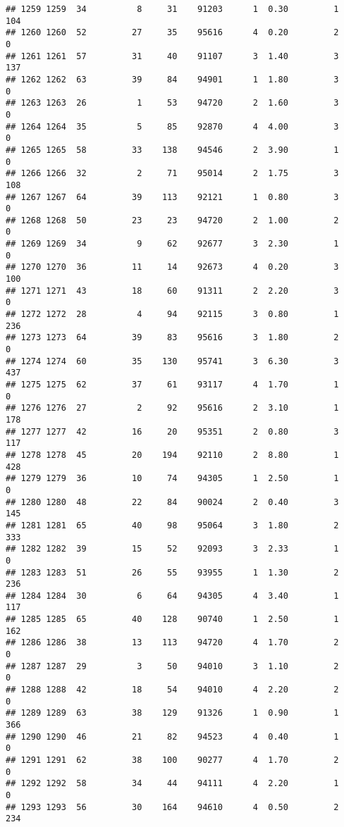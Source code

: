 \documentclass[
]{article}
\begin{document}
\begin{verbatim}
## 1259 1259  34          8     31    91203      1  0.30         1      104
## 1260 1260  52         27     35    95616      4  0.20         2        0
## 1261 1261  57         31     40    91107      3  1.40         3      137
## 1262 1262  63         39     84    94901      1  1.80         3        0
## 1263 1263  26          1     53    94720      2  1.60         3        0
## 1264 1264  35          5     85    92870      4  4.00         3        0
## 1265 1265  58         33    138    94546      2  3.90         1        0
## 1266 1266  32          2     71    95014      2  1.75         3      108
## 1267 1267  64         39    113    92121      1  0.80         3        0
## 1268 1268  50         23     23    94720      2  1.00         2        0
## 1269 1269  34          9     62    92677      3  2.30         1        0
## 1270 1270  36         11     14    92673      4  0.20         3      100
## 1271 1271  43         18     60    91311      2  2.20         3        0
## 1272 1272  28          4     94    92115      3  0.80         1      236
## 1273 1273  64         39     83    95616      3  1.80         2        0
## 1274 1274  60         35    130    95741      3  6.30         3      437
## 1275 1275  62         37     61    93117      4  1.70         1        0
## 1276 1276  27          2     92    95616      2  3.10         1      178
## 1277 1277  42         16     20    95351      2  0.80         3      117
## 1278 1278  45         20    194    92110      2  8.80         1      428
## 1279 1279  36         10     74    94305      1  2.50         1        0
## 1280 1280  48         22     84    90024      2  0.40         3      145
## 1281 1281  65         40     98    95064      3  1.80         2      333
## 1282 1282  39         15     52    92093      3  2.33         1        0
## 1283 1283  51         26     55    93955      1  1.30         2      236
## 1284 1284  30          6     64    94305      4  3.40         1      117
## 1285 1285  65         40    128    90740      1  2.50         1      162
## 1286 1286  38         13    113    94720      4  1.70         2        0
## 1287 1287  29          3     50    94010      3  1.10         2        0
## 1288 1288  42         18     54    94010      4  2.20         2        0
## 1289 1289  63         38    129    91326      1  0.90         1      366
## 1290 1290  46         21     82    94523      4  0.40         1        0
## 1291 1291  62         38    100    90277      4  1.70         2        0
## 1292 1292  58         34     44    94111      4  2.20         1        0
## 1293 1293  56         30    164    94610      4  0.50         2      234

\end{verbatim}
\end{document}
